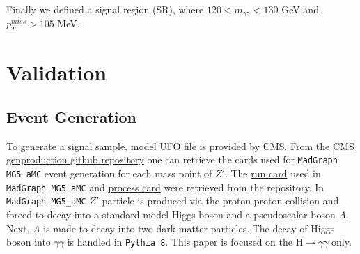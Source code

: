 \documentclass[12pt,A4paper]{article}
\begin{document}
Finally we defined a signal region (SR), where $120 < m_{\gamma\gamma} < 130$ GeV and $p_T^{miss} > 105$ MeV.


\section{Validation}
\subsection{Event Generation}
To generate a signal sample, \href{http://rkhurana.web.cern.ch/rkhurana/monoH/models/}{model UFO file} is provided by CMS. From the \href{https://github.com/cms-sw/genproductions/tree/master/bin/MadGraph5_aMCatNLO/cards/production/13TeV/monoHiggs/Zp2HDM/Zprime_A0h_A0chichi}{CMS genproduction github repository}\cite{ref:gitgen} one can retrieve the cards used for \texttt{MadGraph MG5\_aMC}\cite{ref:mg5} event generation for each mass point of $Z'$. 
The \href{https://github.com/cms-sw/genproductions/blob/mg240/bin/MadGraph5_aMCatNLO/cards/production/13TeV/monoHiggs/Zp2HDM/Zprime_A0h_A0chichi/Zprime_A0h_A0chichi_MZp600_MA0300/Zprime_A0h_A0chichi_MZp600_MA0300_run_card.dat}{run card} used in \texttt{MadGraph MG5\_aMC} and \href{https://github.com/cms-sw/genproductions/blob/mg240/bin/MadGraph5_aMCatNLO/cards/production/13TeV/monoHiggs/Zp2HDM/Zprime_A0h_A0chichi/Zprime_A0h_A0chichi_MZp600_MA0300/Zprime_A0h_A0chichi_MZp600_MA0300_proc_card.dat}{process card} were retrieved from the repository. 
In \texttt{MadGraph MG5\_aMC} $Z'$ particle is produced via the proton-proton collision and forced to decay into a standard model Higgs boson and a pseudoscalar boson $A$. 
Next, $A$ is made to decay into two dark matter particles. The decay of Higgs boson into $\gamma\gamma$ is handled in \texttt{Pythia 8}\cite{ref:pythia}. This paper is focused on the H$\rightarrow\gamma\gamma$ only.
\end{document}
